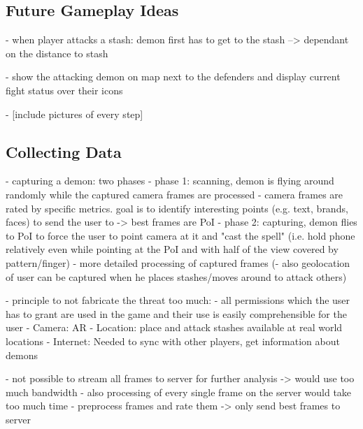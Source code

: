 \subsection{Future Gameplay Ideas}
\label{subsec:futuregameplayideas}

- when player attacks a stash: demon first has to get to the stash --> dependant on the distance to stash 

- show the attacking demon on map next to the defenders and display current fight status over their icons


- [include pictures of every step]

\subsection{Collecting Data}
\label{subsec:collectingdata}

- capturing a demon: two phases
- phase 1: scanning, demon is flying around randomly while the captured camera frames are processed
- camera frames are rated by specific metrics. goal is to identify interesting points (e.g. text, brands, faces) to send the user to -> best frames are PoI
- phase 2: capturing, demon flies to PoI to force the user to point camera at it and "cast the spell" (i.e. hold phone relatively even while pointing at the PoI and with half of the view covered by pattern/finger)
- more detailed processing of captured frames
(- also geolocation of user can be captured when he places stashes/moves around to attack others)

- principle to not fabricate the threat too much:
- all permissions which the user has to grant are used in the game and their use is easily comprehensible for the user
 - Camera: AR
 - Location: place and attack stashes available at real world locations
 - Internet: Needed to sync with other players, get information about demons
 
- not possible to stream all frames to server for further analysis -> would use too much bandwidth
- also processing of every single frame on the server would take too much time 
- preprocess frames and rate them -> only send best frames to server
